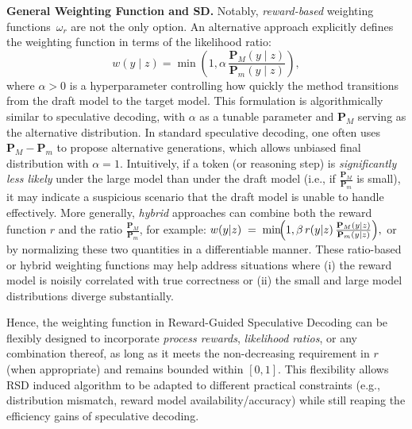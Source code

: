 \documentclass{article}
\theoremstyle{plain}
\theoremstyle{definition}
\theoremstyle{remark}
\begin{document}
\textbf{General Weighting Function and SD.}
Notably, \emph{reward-based} weighting functions~\(\omega_r\) are not the only option. An alternative approach explicitly defines the weighting function in terms of the likelihood ratio:
\[
w(y \mid z) = \min \left(1, \alpha\,\frac{\mathbf{P}_M(y \mid z)}{\mathbf{P}_m(y \mid z)}\right),
\]
where \(\alpha > 0\) is a hyperparameter controlling how quickly the method transitions from the draft model to the target model. This formulation is algorithmically similar to speculative decoding, with \(\alpha\) as a tunable parameter and \(\mathbf{P}_M\) serving as the alternative distribution. In standard speculative decoding, one often uses \(\mathbf{P}_M - \mathbf{P}_m\) to propose alternative generations, which allows  unbiased final distribution with $\alpha=1$.
Intuitively, if a token (or reasoning step) is \emph{significantly less likely} under the large model than under the draft model (i.e., if \(\frac{\mathbf{P}_M}{\mathbf{P}_m}\) is small), it may indicate a suspicious scenario that the draft model is unable to handle effectively.
More generally, \emph{hybrid} approaches can combine both the reward function $r$ and the ratio $\frac{\mathbf{P}_M}{\mathbf{P}_m}$, for example:
$
w(y| z)\;=\;\min\!\Bigl(1, \beta\,r(y| z)\,\frac{\mathbf{P}_M(y| z)}{\mathbf{P}_m(y| z)}\Bigr),
$
or by normalizing these two quantities in a differentiable manner. These ratio-based or hybrid weighting functions may help address situations where (i) the reward model is noisily correlated with true correctness or (ii) the small and large model distributions diverge substantially. 



Hence, the weighting function in Reward-Guided Speculative Decoding can be flexibly designed to incorporate \emph{process rewards}, \emph{likelihood ratios}, or any combination thereof, as long as it meets the non-decreasing requirement in $r$ (when appropriate) and remains bounded within $[0,1]$. This flexibility allows RSD induced algorithm to be adapted to different practical constraints (e.g., distribution mismatch, reward model availability/accuracy) while still reaping the efficiency gains of speculative decoding.
\end{document}
